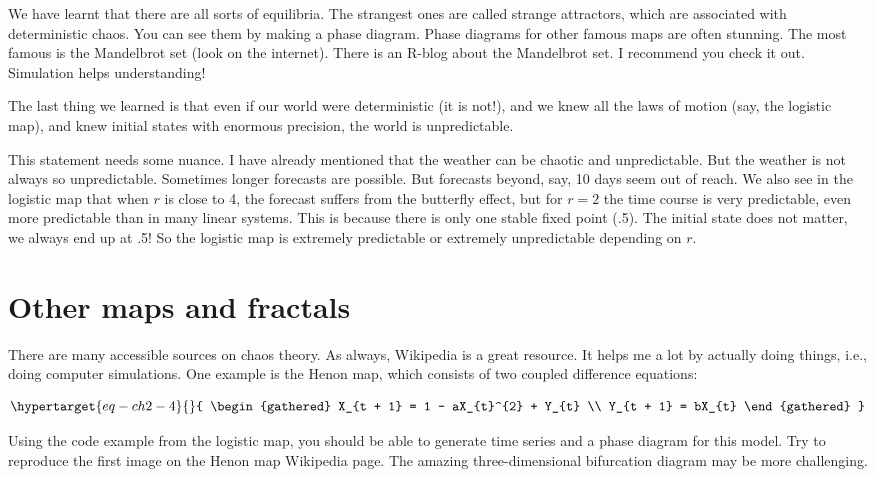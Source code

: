 \documentclass[
  a4paper,
  DIV=11,
  numbers=noendperiod]{scrreprt}
\begin{document}
We have learnt that there are all sorts of equilibria. The strangest
ones are called strange attractors, which are associated with
deterministic chaos. You can see them by making a phase diagram. Phase
diagrams for other famous maps are often stunning. The most famous is
the Mandelbrot set (look on the internet). There is an R-blog about the
Mandelbrot set. I recommend you check it out. Simulation helps
understanding!

The last thing we learned is that even if our world were deterministic
(it is not!), and we knew all the laws of motion (say, the logistic
map), and knew initial states with enormous precision, the world is
unpredictable.

This statement needs some nuance. I have already mentioned that the
weather can be chaotic and unpredictable. But the weather is not always
so unpredictable. Sometimes longer forecasts are possible. But forecasts
beyond, say, 10 days seem out of reach. We also see in the logistic map
that when \(r\) is close to 4, the forecast suffers from the butterfly
effect, but for \(r = 2\) the time course is very predictable, even more
predictable than in many linear systems. This is because there is only
one stable fixed point (.5). The initial state does not matter, we
always end up at .5! So the logistic map is extremely predictable or
extremely unpredictable depending on \(r\).

\hypertarget{sec-Other-maps-and-fractals}{%
\section{Other maps and fractals}\label{sec-Other-maps-and-fractals}}

There are many accessible sources on chaos theory. As always, Wikipedia
is a great resource. It helps me a lot by actually doing things, i.e.,
doing computer simulations. One example is the Henon map, which consists
of two coupled difference equations:

\begin{equation}\protect\hypertarget{eq-ch2-4}{}{
\begin{gathered}
X_{t + 1} = 1 - aX_{t}^{2} + Y_{t} \\
Y_{t + 1} = bX_{t} 
\end{gathered}
}\label{eq-ch2-4}\end{equation}

Using the code example from the logistic map, you should be able to
generate time series and a phase diagram for this model. Try to
reproduce the first image on the Henon map Wikipedia page. The amazing
three-dimensional bifurcation diagram may be more challenging.
\end{document}
